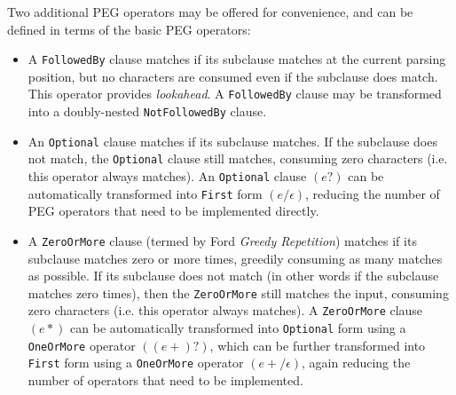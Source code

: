 \documentclass[manuscript,screen]{acmart}
\begin{document}
Two additional PEG operators may be offered for convenience, and can be defined in terms of the basic PEG operators:

\begin{itemize}
    \item A \texttt{FollowedBy} clause matches if its subclause matches at the current parsing position, but no characters are consumed even if the subclause does match. This operator provides \emph{lookahead}. A \texttt{FollowedBy} clause may be transformed into a doubly-nested \texttt{NotFollowedBy} clause.
    \item An \texttt{Optional} clause matches if its subclause matches. If the subclause does not match, the \texttt{Optional} clause still matches, consuming zero characters (i.e. this operator always matches). An \texttt{Optional} clause $(e?)$ can be automatically transformed into \texttt{First} form $(e / \epsilon)$, reducing the number of PEG operators that need to be implemented directly.
    \item A \texttt{ZeroOrMore} clause (termed by Ford \emph{Greedy Repetition}) matches if its subclause matches zero or more times, greedily consuming as many matches as possible. If its subclause does not match (in other words if the subclause matches zero times), then the \texttt{ZeroOrMore} still matches the input, consuming zero characters (i.e. this operator always matches). A \texttt{ZeroOrMore} clause $(e*)$ can be automatically transformed into \texttt{Optional} form using a \texttt{OneOrMore} operator $((e+)?)$, which can be further transformed into \texttt{First} form using a \texttt{OneOrMore} operator $({e+} / \epsilon)$, again reducing the number of operators that need to be implemented.
\end{itemize}
\end{document}
